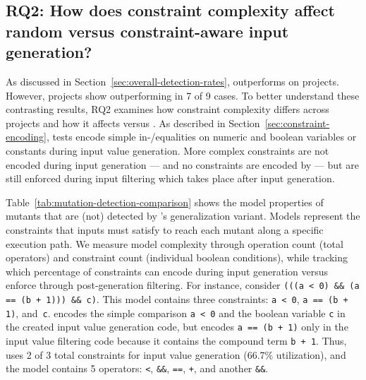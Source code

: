 \subsection{RQ2: How does constraint complexity affect random versus constraint-aware input generation?}
\label{sec:constraint-complexity-eval}

As discussed in Section~\ref{sec:overall-detection-rates},
\VariantNaive{} outperforms \VariantImproved{} on \DatasetsEqBenchEs{} projects.
However, \DatasetsCommonsEs{} projects show \VariantImproved{}
outperforming \VariantNaive{} in 7 of 9 cases.
To better understand these contrasting results, RQ2 examines
how constraint complexity differs across projects and
how it affects \VariantNaive{} versus \VariantImproved{}.
As described in Section~\ref{sec:constraint-encoding},
\VariantImproved{} tests
encode simple in-/equalities on numeric and boolean variables or constants
during input value generation.
More complex constraints are not encoded
during \VariantImproved{} input generation
--- and no constraints are encoded by \VariantNaive{} ---
but are still enforced during input filtering
which takes place after input generation.

Table~\ref{tab:mutation-detection-comparison} shows the model properties
of mutants that are (not) detected by \ToolTeralizer{}'s \VariantImprovedC{} generalization variant.
Models represent the constraints that inputs must satisfy
to reach each mutant along a specific execution path.
We measure model complexity through operation count (total operators)
and constraint count (individual boolean conditions),
while tracking which percentage of constraints \VariantImproved{} can encode
during input generation versus enforce through post-generation filtering.
For instance, consider \texttt{(((a < 0) \&\& (a == (b + 1))) \&\& c)}.
This model contains three constraints:
\texttt{a < 0}, \texttt{a == (b + 1)}, and~\texttt{c}.
\VariantImproved{} encodes the simple comparison \texttt{a < 0} and the boolean variable \texttt{c}
in the created input value generation code,
but encodes \texttt{a~==~(b~+~1)} only in the input value filtering code
because it contains the compound term \texttt{b + 1}.
Thus, \VariantImproved{} uses 2 of 3 total constraints for input value generation (66.7\% utilization),
and the model contains 5 operators:
\texttt{<}, \texttt{\&\&}, \texttt{==}, \texttt{+}, and another \texttt{\&\&}.



